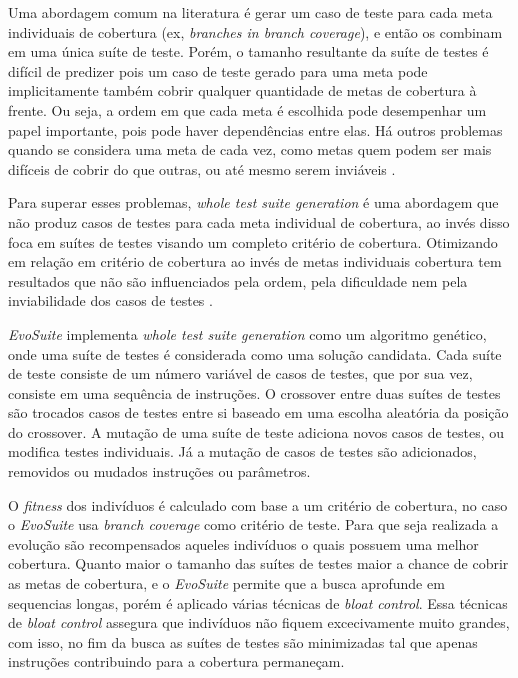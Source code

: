 \documentclass[12pt,a4paper]{article}
\begin{document}
Uma abordagem comum na literatura é gerar um caso de teste para cada meta individuais de cobertura (ex, \textit{branches in branch coverage}), e então os combinam em uma única suíte de teste. Porém, o tamanho resultante da suíte de testes é difícil de predizer pois um caso de teste gerado para uma meta pode implicitamente também cobrir qualquer quantidade de metas de cobertura à frente. Ou seja, a ordem em que cada meta é escolhida pode desempenhar um papel importante, pois pode haver dependências entre elas. Há outros problemas quando se considera uma meta de cada vez, como metas quem podem ser mais difíceis de cobrir do que outras, ou até mesmo serem inviáveis \cite{fraser2013whole}.

Para superar esses problemas, \textit{whole test suite generation} é uma abordagem que não produz casos de testes para cada meta individual de cobertura, ao invés disso foca em suítes de testes visando um completo critério de cobertura. Otimizando em relação em critério de cobertura ao invés de metas individuais cobertura tem resultados que não são influenciados pela ordem, pela dificuldade nem pela inviabilidade dos casos de testes \cite{fraser2011evosuite}.

\textit{EvoSuite} implementa \textit{whole test suite generation} como um algoritmo genético, onde uma suíte de testes é considerada como uma solução candidata. Cada suíte de teste consiste de um número variável de casos de testes, que por sua vez, consiste em uma sequência de instruções. O crossover entre duas suítes de testes são trocados casos de testes entre si baseado em uma escolha aleatória da posição do crossover. A mutação de uma suíte de teste adiciona novos casos de testes, ou modifica testes individuais. Já a mutação de casos de testes são adicionados, removidos ou mudados instruções ou parâmetros.

O \textit{fitness} dos indivíduos é calculado com base a um critério de cobertura, no caso o \textit{EvoSuite} usa \textit{branch coverage} como critério de teste. Para que seja realizada a evolução são recompensados aqueles indivíduos o quais possuem uma melhor cobertura. Quanto maior o tamanho das suítes de testes maior a chance de cobrir as metas de cobertura, e o \textit{EvoSuite} permite que a busca aprofunde em sequencias longas, porém é aplicado várias técnicas de \textit{bloat control}. Essa técnicas de \textit{bloat control} assegura que indivíduos não fiquem excecivamente muito grandes, com isso, no fim da busca as suítes de testes são minimizadas tal que apenas instruções contribuindo para a cobertura permaneçam.
\end{document}
